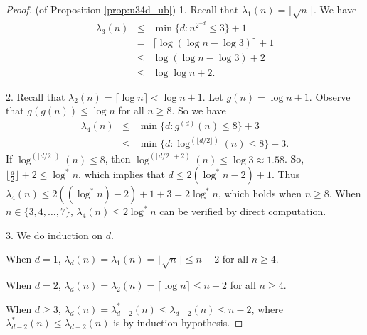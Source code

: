 \documentclass[11pt]{article}
\begin{document}
\begin{proof} (of Proposition \ref{prop:u34d_ub})
	1. Recall that $\lambda_1(n) = \lfloor \sqrt{n} \rfloor$. We have
\begin{eqnarray*}
\lambda_3(n) & \le & \min\{d : n^{2^{-d}} \le 3 \} + 1 \\
& = & \lceil \log\left(\log n - \log 3\right) \rceil + 1 \\
& \le &  \log\left(\log n - \log 3\right) + 2 \\
& \le & \log\log n + 2.
\end{eqnarray*}

2. Recall that $\lambda_2(n) = \lceil \log n \rceil < \log n + 1$. Let $g(n) = \log n + 1$.
Observe that $g(g(n)) \le \log n$ for all $n \ge 8$. So we have
\begin{eqnarray*}
	\lambda_4(n) & \le & \min\{ d : g^{(d)}(n) \le 8 \} + 3 \\
	& \le & \min\{ d : \log^{(\lfloor d/2 \rfloor)}(n) \le 8 \} + 3.
\end{eqnarray*}
If $\log^{(\lfloor d/2 \rfloor)}(n) \le 8$, then $\log^{(\lfloor d/2 \rfloor + 2)}(n) \le \log 3 	\approx 1.58$. So, $\lfloor \frac{d}{2} \rfloor + 2 \le \log^* n$, which implies that $d \le 2(\log^*n - 2) + 1$.
 Thus $\lambda_4(n) \le 2 ((\log^*n) - 2) + 1 + 3 = 2 \log^*n$,
which holds when $n \ge 8$. When $n \in \{3, 4, \ldots, 7\}$, $\lambda_4(n) \le 2 \log^*n$ can be verified by direct computation.

3. We do induction on $d$.

When $d = 1$, $\lambda_d(n) = \lambda_1(n) = \lfloor \sqrt{n} \rfloor \le n - 2$ for all $n \ge 4$.

When $d = 2$, $\lambda_d(n) = \lambda_2(n) = \lceil \log n \rceil \le n - 2$ for all $n \ge 4$.

When $d \ge 3$, $\lambda_d(n) = \lambda^*_{d-2}(n) \le \lambda_{d-2}(n) \le n - 2$, where $\lambda^*_{d-2}(n) \le \lambda_{d-2}(n)$ is by induction hypothesis.
\end{proof}
\end{document}
